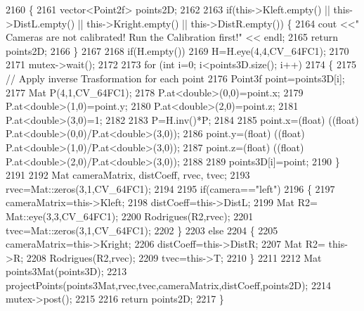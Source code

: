 \begin{DoxyCode}
2160 \{
2161     vector<Point2f> points2D;
2162 
2163     \textcolor{keywordflow}{if}(this->Kleft.empty() || this->DistL.empty() || this->Kright.empty() || this->DistR.empty()) \{
2164         cout <<\textcolor{stringliteral}{" Cameras are not calibrated! Run the Calibration first!"} << endl;
2165         \textcolor{keywordflow}{return} points2D;
2166     \}
2167 
2168     \textcolor{keywordflow}{if}(H.empty())
2169         H=H.eye(4,4,CV\_64FC1);
2170 
2171     mutex->wait();
2172 
2173     \textcolor{keywordflow}{for} (\textcolor{keywordtype}{int} i=0; i<points3D.size(); i++)
2174     \{
2175         \textcolor{comment}{// Apply inverse Trasformation for each point}
2176         Point3f point=points3D[i];
2177         Mat P(4,1,CV\_64FC1);
2178         P.at<\textcolor{keywordtype}{double}>(0,0)=point.x;
2179         P.at<\textcolor{keywordtype}{double}>(1,0)=point.y;
2180         P.at<\textcolor{keywordtype}{double}>(2,0)=point.z;
2181         P.at<\textcolor{keywordtype}{double}>(3,0)=1;
2182 
2183         P=H.inv()*P;
2184 
2185         point.x=(float) ((\textcolor{keywordtype}{float}) P.at<\textcolor{keywordtype}{double}>(0,0)/P.at<\textcolor{keywordtype}{double}>(3,0));
2186         point.y=(float) ((\textcolor{keywordtype}{float}) P.at<\textcolor{keywordtype}{double}>(1,0)/P.at<\textcolor{keywordtype}{double}>(3,0));
2187         point.z=(float) ((\textcolor{keywordtype}{float}) P.at<\textcolor{keywordtype}{double}>(2,0)/P.at<\textcolor{keywordtype}{double}>(3,0));
2188 
2189         points3D[i]=point;
2190     \}
2191 
2192     Mat cameraMatrix, distCoeff, rvec, tvec;
2193     rvec=Mat::zeros(3,1,CV\_64FC1);
2194 
2195     \textcolor{keywordflow}{if}(camera==\textcolor{stringliteral}{"left"})
2196     \{
2197         cameraMatrix=this->Kleft;
2198         distCoeff=this->DistL;
2199         Mat R2= Mat::eye(3,3,CV\_64FC1);
2200         Rodrigues(R2,rvec);
2201         tvec=Mat::zeros(3,1,CV\_64FC1);
2202     \}
2203     \textcolor{keywordflow}{else}
2204     \{
2205         cameraMatrix=this->Kright;
2206         distCoeff=this->DistR;
2207         Mat R2= this->R;
2208         Rodrigues(R2,rvec);
2209         tvec=this->T;
2210     \}
2211 
2212     Mat points3Mat(points3D);
2213     projectPoints(points3Mat,rvec,tvec,cameraMatrix,distCoeff,points2D);
2214     mutex->post();
2215 
2216     \textcolor{keywordflow}{return} points2D;
2217 \}
\end{DoxyCode}
